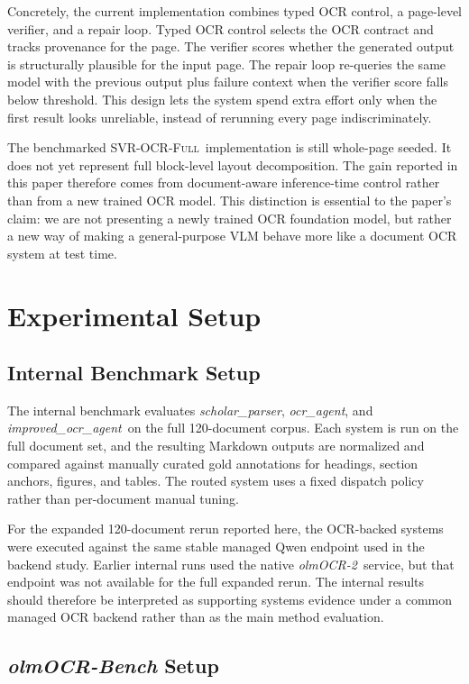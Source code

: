 \documentclass[conference]{IEEEtran}
\newcommand{\papername}[1]{\textit{#1}}
\newcommand{\scholar}{\papername{scholar\_parser}}
\newcommand{\ocragent}{\papername{ocr\_agent}}
\newcommand{\improvedocr}{\papername{improved\_ocr\_agent}}
\newcommand{\svrocr}{\textsc{SVR-OCR-Full}}
\newcommand{\olmocr}{\papername{olmOCR-2}}
\begin{document}
Concretely, the current implementation combines typed OCR control, a page-level verifier, and a repair loop. Typed OCR control selects the OCR contract and tracks provenance for the page. The verifier scores whether the generated output is structurally plausible for the input page. The repair loop re-queries the same model with the previous output plus failure context when the verifier score falls below threshold. This design lets the system spend extra effort only when the first result looks unreliable, instead of rerunning every page indiscriminately.

The benchmarked \svrocr\ implementation is still whole-page seeded. It does not yet represent full block-level layout decomposition. The gain reported in this paper therefore comes from document-aware inference-time control rather than from a new trained OCR model. This distinction is essential to the paper's claim: we are not presenting a newly trained OCR foundation model, but rather a new way of making a general-purpose VLM behave more like a document OCR system at test time.

\section{Experimental Setup}

\subsection{Internal Benchmark Setup}

The internal benchmark evaluates \scholar, \ocragent, and \improvedocr\ on the full 120-document corpus. Each system is run on the full document set, and the resulting Markdown outputs are normalized and compared against manually curated gold annotations for headings, section anchors, figures, and tables. The routed system uses a fixed dispatch policy rather than per-document manual tuning.

For the expanded 120-document rerun reported here, the OCR-backed systems were executed against the same stable managed Qwen endpoint used in the backend study. Earlier internal runs used the native \olmocr\ service, but that endpoint was not available for the full expanded rerun. The internal results should therefore be interpreted as supporting systems evidence under a common managed OCR backend rather than as the main method evaluation.

\subsection{\papername{olmOCR-Bench} Setup}
\end{document}
